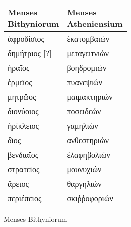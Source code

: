 %
\normalsize
\centering
\begin{tabular}{@{} l l @{}}
\toprule
\parbox[b]{6em}{Menses \\ Bithyniorum} &
\parbox[b]{6em}{Menses \\ Atheniensium} \\
\midrule
\textgreek{ἀφροδίσιος}    &\textgreek{ἑκατομβαιών} \\
\textgreek{δημήτριος [?]} &\textgreek{μεταγειτνιών} \\
\textgreek{ἡραῖος}        &\textgreek{βοηδρομιών} \\
%
\textgreek{ἑρμεῖος}        &\textgreek{πυανεψιών} \\
\textgreek{μητρῶος}       &\textgreek{μαιμακτηριών} \\
\textgreek{διονύοιος}      &\textgreek{ποσειδεών} \\
%
\textgreek{ἡρίκλειος}       &\textgreek{γαμηλιών} \\
\textgreek{δῖος}           &\textgreek{ανθεστηριών} \\
\textgreek{βενδιαῖος}        &\textgreek{ἐλαφηβολιών} \\
%
\textgreek{στρατεῖος}      &\textgreek{μουνυχιών} \\
\textgreek{ἄρειος}          &\textgreek{θαργηλιών} \\
\textgreek{περιέπειος}      &\textgreek{σκιῤῥοφοριών} \\
\bottomrule
\end{tabular}
%
\caption{Menses Bithyniorum}
\label{tab:p050b}
